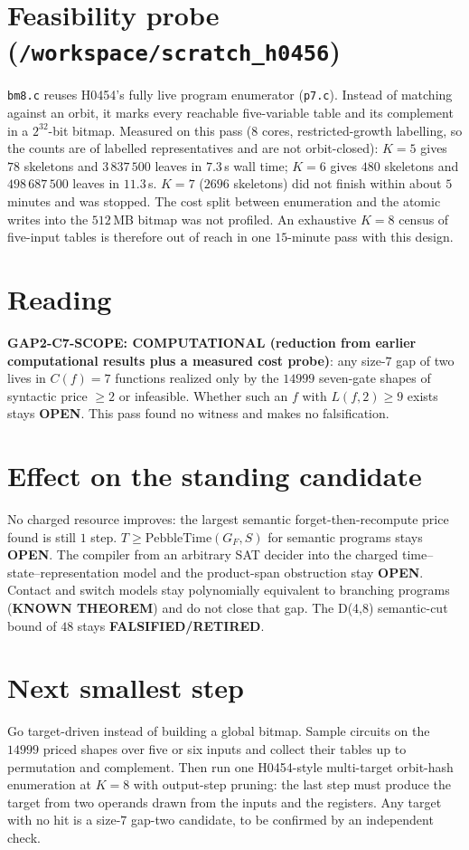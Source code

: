 \documentclass[11pt]{article}
\begin{document}
\section*{Feasibility probe (\texttt{/workspace/scratch\_h0456})}
\texttt{bm8.c} reuses H0454's fully live program enumerator (\texttt{p7.c}). Instead of matching against an orbit, it marks every reachable five-variable table and its complement in a $2^{32}$-bit bitmap. Measured on this pass (8 cores, restricted-growth labelling, so the counts are of labelled representatives and are not orbit-closed): $K=5$ gives $78$ skeletons and $3\,837\,500$ leaves in $7.3$\,s wall time; $K=6$ gives $480$ skeletons and $498\,687\,500$ leaves in $11.3$\,s. $K=7$ ($2696$ skeletons) did not finish within about $5$ minutes and was stopped. The cost split between enumeration and the atomic writes into the $512$\,MB bitmap was not profiled. An exhaustive $K=8$ census of five-input tables is therefore out of reach in one $15$-minute pass with this design.

\section*{Reading}
\textbf{GAP2-C7-SCOPE: COMPUTATIONAL (reduction from earlier computational results plus a measured cost probe)}: any size-$7$ gap of two lives in $C(f)=7$ functions realized only by the $14999$ seven-gate shapes of syntactic price $\ge2$ or infeasible. Whether such an $f$ with $L(f,2)\ge9$ exists stays \textbf{OPEN}. This pass found no witness and makes no falsification.

\section*{Effect on the standing candidate}
No charged resource improves: the largest semantic forget-then-recompute price found is still $1$ step. $T\ge\mathrm{PebbleTime}(G_F,S)$ for semantic programs stays \textbf{OPEN}. The compiler from an arbitrary SAT decider into the charged time--state--representation model and the product-span obstruction stay \textbf{OPEN}. Contact and switch models stay polynomially equivalent to branching programs (\textbf{KNOWN THEOREM}) and do not close that gap. The D(4,8) semantic-cut bound of $48$ stays \textbf{FALSIFIED/RETIRED}.

\section*{Next smallest step}
Go target-driven instead of building a global bitmap. Sample circuits on the $14999$ priced shapes over five or six inputs and collect their tables up to permutation and complement. Then run one H0454-style multi-target orbit-hash enumeration at $K=8$ with output-step pruning: the last step must produce the target from two operands drawn from the inputs and the registers. Any target with no hit is a size-$7$ gap-two candidate, to be confirmed by an independent check.
\end{document}
